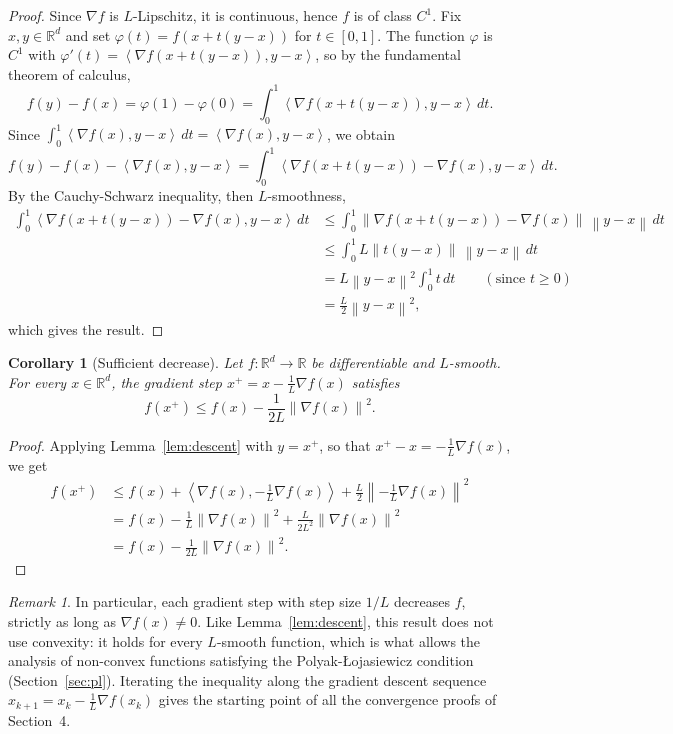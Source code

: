 \documentclass[11pt,a4paper]{article}
\newtheorem{corollary}{Corollary}
\theoremstyle{definition}
\theoremstyle{remark}
\newtheorem{remark}{Remark}
\newcommand{\R}{\mathbb{R}}
\newcommand{\norm}[1]{\left\lVert #1 \right\rVert}
\newcommand{\ip}[2]{\left\langle #1, #2 \right\rangle}
\begin{document}
\begin{proof}
Since $\nabla f$ is $L$-Lipschitz, it is continuous, hence $f$ is of class $C^1$. Fix $x, y \in \R^d$ and set $\varphi(t) = f(x + t(y - x))$ for $t \in [0,1]$. The function $\varphi$ is $C^1$ with $\varphi'(t) = \ip{\nabla f(x + t(y-x))}{y - x}$, so by the fundamental theorem of calculus,
\[
f(y) - f(x) = \varphi(1) - \varphi(0) = \int_0^1 \ip{\nabla f(x + t(y-x))}{y - x} \, dt .
\]
Since $\int_0^1 \ip{\nabla f(x)}{y - x}\, dt = \ip{\nabla f(x)}{y - x}$, we obtain
\[
f(y) - f(x) - \ip{\nabla f(x)}{y - x} = \int_0^1 \ip{\nabla f(x + t(y-x)) - \nabla f(x)}{y - x} \, dt .
\]
By the Cauchy-Schwarz inequality, then $L$-smoothness,
\begin{align*}
\int_0^1 \ip{\nabla f(x + t(y-x)) - \nabla f(x)}{y - x} \, dt
&\le \int_0^1 \norm{\nabla f(x + t(y-x)) - \nabla f(x)} \, \norm{y - x} \, dt \\
&\le \int_0^1 L \norm{t(y - x)} \, \norm{y - x} \, dt \\
&= L \norm{y - x}^2 \int_0^1 t \, dt \qquad (\text{since } t \ge 0)\\
&= \frac{L}{2} \norm{y - x}^2 ,
\end{align*}
which gives the result.
\end{proof}

\begin{corollary}[Sufficient decrease]\label{cor:sufficient}
Let $f : \R^d \to \R$ be differentiable and $L$-smooth. For every $x \in \R^d$, the gradient step $x^+ = x - \frac{1}{L}\nabla f(x)$ satisfies
\[
f(x^+) \le f(x) - \frac{1}{2L}\norm{\nabla f(x)}^2 .
\]
\end{corollary}

\begin{proof}
Applying Lemma~\ref{lem:descent} with $y = x^+$, so that $x^+ - x = -\frac{1}{L}\nabla f(x)$, we get
\begin{align*}
f(x^+) &\le f(x) + \ip{\nabla f(x)}{-\tfrac{1}{L}\nabla f(x)} + \frac{L}{2}\norm{-\tfrac{1}{L}\nabla f(x)}^2 \\
&= f(x) - \frac{1}{L}\norm{\nabla f(x)}^2 + \frac{L}{2L^2}\norm{\nabla f(x)}^2 \\
&= f(x) - \frac{1}{2L}\norm{\nabla f(x)}^2 .
\end{align*}
\end{proof}

\begin{remark}
In particular, each gradient step with step size $1/L$ decreases $f$, strictly as long as $\nabla f(x) \neq 0$. Like Lemma~\ref{lem:descent}, this result does not use convexity: it holds for every $L$-smooth function, which is what allows the analysis of non-convex functions satisfying the Polyak-{\L}ojasiewicz condition (Section~\ref{sec:pl}). Iterating the inequality along the gradient descent sequence $x_{k+1} = x_k - \frac{1}{L}\nabla f(x_k)$ gives the starting point of all the convergence proofs of Section~4.
\end{remark}
\end{document}
